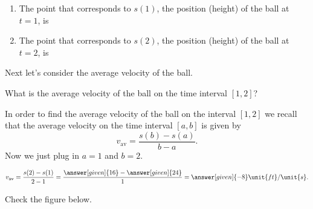 \documentclass{ximera}
\begin{document}
\begin{example}
\begin {question}
\begin{enumerate}
		\item The point that corresponds to $s(1)$, the position (height) of the 
		ball at $t=1$, is 
			\begin{multipleChoice} 
			\end{multipleChoice} 
		
		
		\item The point that corresponds to $s(2)$, the position (height) of the 
		ball at $t=2$, is 
			\begin{multipleChoice} 
				\choice{A}
				\choice{B}
				\choice[correct]{C}
				\choice{D}
			\end{multipleChoice} 
	\end{enumerate}
\end {question}


Next let's consider the average velocity of the ball.
\begin{question}
	 What is the average velocity of the ball on the time interval $[1,2]$?
	
	
	\begin{explanation}
		In order to find the average velocity of the ball on the interval $[1,2]$ we recall that the average velocity on 
		the time interval $[a,b]$ is given by
		\[ v_{\text{av}} = \frac{s(b) - s\left({a}\right)}{b-a}.\]
		Now we just plug in $a=1$ and $b=2$. 
	
		\[v_{\text{av}} = \frac{s(2)-s(1)}{2-1} = \frac{\answer[given]{16} - \answer[given]{24}}{1} =
			\answer[given]{-8}\unit{ft}/\unit{s}.\] 
		
		Check the figure below.
		\begin{image}
\end{image}
\end{explanation}
\end{question}
\end{example}
\end{document}
